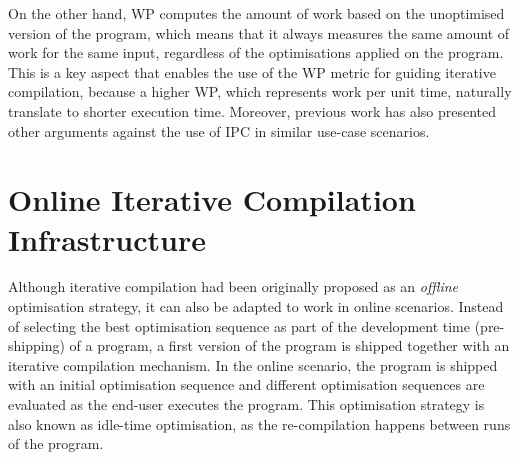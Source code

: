 \documentclass[sigplan,10pt]{acmart}
\theoremstyle{definition}
\newcommand{\itercomp}{{iterative compilation}}
\newcommand{\IterComp}{{Iterative Compilation}}
\begin{document}
%

On the other hand, WP computes the amount of work based on the unoptimised version of the program, which means that it always measures the same amount of work for the same input, regardless of the optimisations applied on the program.
This is a key aspect that enables the use of the WP metric for guiding {\itercomp}, because a higher WP, which represents work per unit time, naturally translate to shorter execution time.
Moreover, previous work has also presented other arguments against the use of IPC in similar use-case scenarios. %

\section{Online {\IterComp} Infrastructure} \label{sec:oic-infra}

Although {\itercomp} had been originally proposed as an \textit{offline} optimisation strategy, it can also be adapted to work in online scenarios.
Instead of selecting the best optimisation sequence as part of the development time (pre-shipping) of a program, a first version of the program is shipped together with an {\itercomp} mechanism.
In the online scenario, the program is shipped with an initial optimisation sequence and different optimisation sequences are evaluated as the end-user executes the program.
This optimisation strategy is also known as idle-time optimisation, as the re-compilation happens between runs of the program.
\end{document}
